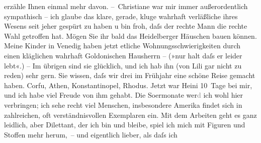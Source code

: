 \begin{ledgroupsized}[t]{13cm}
               erzähle Ihnen einmal mehr davon.\pend
           \pstart
           – Christiane war mir immer außerordentlich
               sympathisch – ich glaube das klare, gerade, kluge wahrhaft verläßliche ihres Wesens
               seit jeher gespürt zu haben u bin froh, daſs der rechte Mann die rechte Wahl getroffen hat. Mögen Sie
               ihr bald das Heidelberger Häuschen bauen können.
               Meine Kinder in Venedig haben jetzt etliche Wohnungsschwierigkeiten
               durch einen kläglichen wahrhaft Goldonischen Hausherrn – (»nur halt daſs er
               leider lebt«.) – Im übrigen sind sie glücklich, und ich hab ihn (von Lili gar nicht zu reden) sehr gern. Sie wissen, daſs wir drei im Frühjahr
               eine schöne Reise gemacht haben. Corfu, Athen, Kon{\pb}stantinopel, Rhodus. Jetzt war Heini 10 Tage bei mir,
               und ich habe viel Freude von ihm gehabt.\pend
           \pstart
           Die So{\geminationm}ermonate wer\textcolor{gray}{d} ich wohl hier
               verbringen; ich sehe recht viel Menschen, insbesondere Amerika findet sich in zahlreichen, oft verständnisvollen Exemplaren ein.
               Mit dem Arbeiten geht es ganz leidlich, aber Dilettant, der ich bin und bleibe, spiel
               ich mich mit Figuren und Stoffen mehr herum, – und eigentlich lieber, als daſs ich

\end{ledgroupsized}
